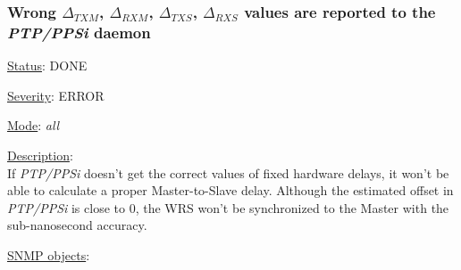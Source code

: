 \subsubsection{\bf Wrong $\Delta_{TXM}$, $\Delta_{RXM}$, $\Delta_{TXS}$,
		$\Delta_{RXS}$ values are reported to the \emph{PTP/PPSi} daemon}
		\label{fail:timing:deltas_report}
		\begin{pck_descr}
			\item [] \underline{Status}: DONE
			\item [] \underline{Severity}: ERROR
			\item [] \underline{Mode}: \emph{all}
			\item [] \underline{Description}:\\
				If \emph{PTP/PPSi} doesn't get the correct values of fixed hardware delays,
				it won't be able to calculate a proper Master-to-Slave delay. Although
				the estimated offset in \emph{PTP/PPSi} is close to 0, the WRS won't be
				synchronized to the Master with the sub-nanosecond accuracy.
			\item [] \underline{SNMP objects}:\\
				{\footnotesize
				\\
				\\
				\\
				\\
				\\
				 \\
				 }
		\end{pck_descr}

